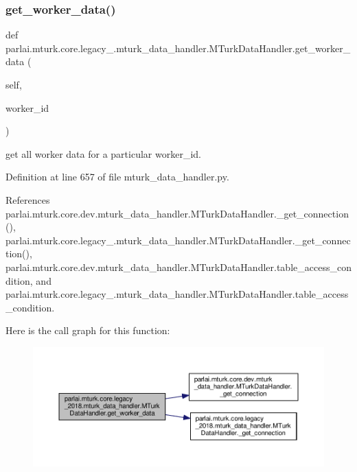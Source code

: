 \subsubsection{\texorpdfstring{get\+\_\+worker\+\_\+data()}{get\_worker\_data()}}
{\footnotesize\ttfamily def parlai.\+mturk.\+core.\+legacy\+\_.\+mturk\+\_\+data\+\_\+handler.\+M\+Turk\+Data\+Handler.\+get\+\_\+worker\+\_\+data (\begin{DoxyParamCaption}\item[{}]{self,  }\item[{}]{worker\+\_\+id }\end{DoxyParamCaption})}

\begin{DoxyVerb}get all worker data for a particular worker_id.\end{DoxyVerb}
 

Definition at line 657 of file mturk\+\_\+data\+\_\+handler.\+py.



References parlai.\+mturk.\+core.\+dev.\+mturk\+\_\+data\+\_\+handler.\+M\+Turk\+Data\+Handler.\+\_\+get\+\_\+connection(), parlai.\+mturk.\+core.\+legacy\+\_.\+mturk\+\_\+data\+\_\+handler.\+M\+Turk\+Data\+Handler.\+\_\+get\+\_\+connection(), parlai.\+mturk.\+core.\+dev.\+mturk\+\_\+data\+\_\+handler.\+M\+Turk\+Data\+Handler.\+table\+\_\+access\+\_\+condition, and parlai.\+mturk.\+core.\+legacy\+\_.\+mturk\+\_\+data\+\_\+handler.\+M\+Turk\+Data\+Handler.\+table\+\_\+access\+\_\+condition.

Here is the call graph for this function\+:
\nopagebreak
\begin{figure}[H]
\begin{center}
\leavevmode
\includegraphics[width=350pt]{classparlai_1_1mturk_1_1core_1_1legacy__2018_1_1mturk__data__handler_1_1MTurkDataHandler_aaaee48085add1dcdca33b9e3c41c3444_cgraph}
\end{center}
\end{figure}
\mbox{\label{classparlai_1_1mturk_1_1core_1_1legacy__2018_1_1mturk__data__handler_1_1MTurkDataHandler_a6c4a99613bcdcf61126d251f7c5d0f29}} 
